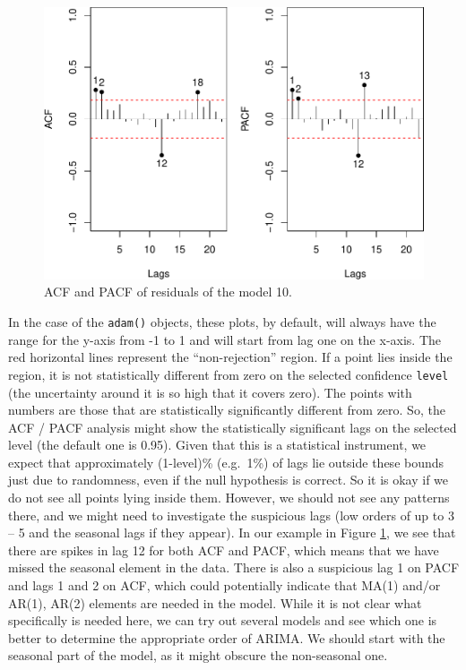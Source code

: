 \documentclass[]{book}
\theoremstyle{definition}
\theoremstyle{definition}
\theoremstyle{definition}
\theoremstyle{definition}
\theoremstyle{remark}
\begin{document}
\begin{figure}
\centering
\includegraphics{Svetunkov--2022----ADAM_files/figure-latex/adamSeat10ACFPACF-1.pdf}
\caption{\label{fig:adamSeat10ACFPACF}ACF and PACF of residuals of the model 10.}
\end{figure}

In the case of the \texttt{adam()} objects, these plots, by default, will always have the range for the y-axis from -1 to 1 and will start from lag one on the x-axis. The red horizontal lines represent the ``non-rejection'' region. If a point lies inside the region, it is not statistically different from zero on the selected confidence \texttt{level} (the uncertainty around it is so high that it covers zero). The points with numbers are those that are statistically significantly different from zero. So, the ACF / PACF analysis might show the statistically significant lags on the selected level (the default one is 0.95). Given that this is a statistical instrument, we expect that approximately (1-level)\% (e.g.~1\%) of lags lie outside these bounds just due to randomness, even if the null hypothesis is correct. So it is okay if we do not see all points lying inside them. However, we should not see any patterns there, and we might need to investigate the suspicious lags (low orders of up to 3 -- 5 and the seasonal lags if they appear). In our example in Figure \ref{fig:adamSeat10ACFPACF}, we see that there are spikes in lag 12 for both ACF and PACF, which means that we have missed the seasonal element in the data. There is also a suspicious lag 1 on PACF and lags 1 and 2 on ACF, which could potentially indicate that MA(1) and/or AR(1), AR(2) elements are needed in the model. While it is not clear what specifically is needed here, we can try out several models and see which one is better to determine the appropriate order of ARIMA. We should start with the seasonal part of the model, as it might obscure the non-seasonal one.
\end{document}
